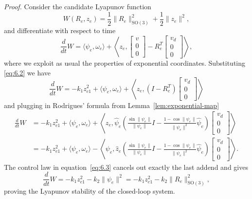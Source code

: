 \documentclass[11pt]{article}
\newcommand{\SO}{\mathrm{SO}}
\begin{document}
\emph{Proof.} Consider the candidate Lyapunov function
\begin{equation*}
W(R_e,z_e)=\frac12\|R_e\|_{\SO(3)}^2+\frac12\|z_e\|^2,
\end{equation*}
and differentiate with respect to time
\begin{equation*}
\frac{d}{dt}W=\langle\psi_e,\omega_e\rangle+
\left\langle z_e,\begin{bmatrix}v\\0\\0\end{bmatrix}-R_e^T\begin{bmatrix}v_d\\0\\0\end{bmatrix}\right\rangle,
\end{equation*}
where we exploit as usual the properties of exponential coordinates. Substituting \eqref{eq:6.2} we have
\begin{equation*}
\frac{d}{dt}W=-k_1z_{e1}^2+\langle\psi_e,\omega_e\rangle+
\left\langle z_e,(I-R_e^T)\begin{bmatrix}v_d\\0\\0\end{bmatrix}\right\rangle
\end{equation*}
and plugging in Rodrigues' formula from Lemma~\ref{lem:exponential-map}
\begin{align*}
\frac{d}{dt}W&=-k_1z_{e1}^2+\langle\psi_e,\omega_e\rangle+
\left\langle z_e,\widehat\psi_e\left(\frac{\sin\|\psi_e\|}{\|\psi_e\|}I-\frac{1-\cos\|\psi_e\|}{\|\psi_e\|^2}\widehat\psi_e\right)\begin{bmatrix}v_d\\0\\0\end{bmatrix}\right\rangle\\
&=-k_1z_{e1}^2+\langle\psi_e,\omega_e\rangle-
\left\langle\psi_e,\widehat z_e\left(\frac{\sin\|\psi_e\|}{\|\psi_e\|}I-\frac{1-\cos\|\psi_e\|}{\|\psi_e\|^2}\widehat\psi_e\right)\begin{bmatrix}v_d\\0\\0\end{bmatrix}\right\rangle.
\end{align*}
The control law in equation~\eqref{eq:6.3} cancels out exactly the last addend and gives
\begin{equation*}
\frac{d}{dt}W=-k_1z_{e1}^2-k_2\|\psi_e\|^2=-k_1z_{e1}^2-k_2\|R_e\|_{\SO(3)}^2,\tag{6.4}\label{eq:6.4}
\end{equation*}
proving the Lyapunov stability of the closed-loop system.
\end{document}
